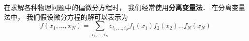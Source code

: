 
在求解各种物理问题中的偏微分方程时， 我们经常使用\textbf{分离变量法}． 在分离变量法中， 我们假设微分方程的解可以表示为
\begin{equation}
f(x_1, \dots , x_N) = \sum_{i_1, \dots, i_N} c_{i_1, \dots, i_N} f_1(x_1) f_2(x_2) \dots f_N(x_N)
\end{equation}



